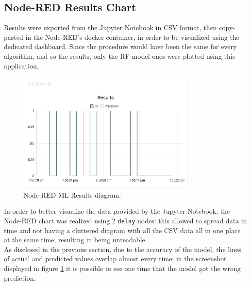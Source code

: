 \documentclass{article}
\begin{document}
\subsection[]{Node-RED Results Chart}

Results were exported from the Jupyter Notebook in CSV format, then copy-pasted in the Node-RED's docker container, in order to be visualized using the dedicated dashboard. Since the procedure would have been the same for every algorithm, and so the results, only the RF model ones were plotted using this application.

\begin{figure}[h!]
	\centering
	\includegraphics[width=9cm]{assets/node-red-chart.png}
	\caption{Node-RED ML Results diagram.}
	\label{fig::node-red-chart}
\end{figure}
In order to better visualize the data provided by the Jupyter Notebook, the Node-RED chart was realized using 2 \texttt{delay} nodes: this allowed to spread data in time and not having a cluttered diagram with all the CSV data all in one place at the same time, resulting in being unreadable. \\ As disclosed in the previous section, due to the accuracy of the model, the lines of actual and predicted values overlap almost every time; in the screenshot displayed in figure \ref{fig::node-red-chart} it is possible to see one time that the model got the wrong prediction.
 
\end{document}
